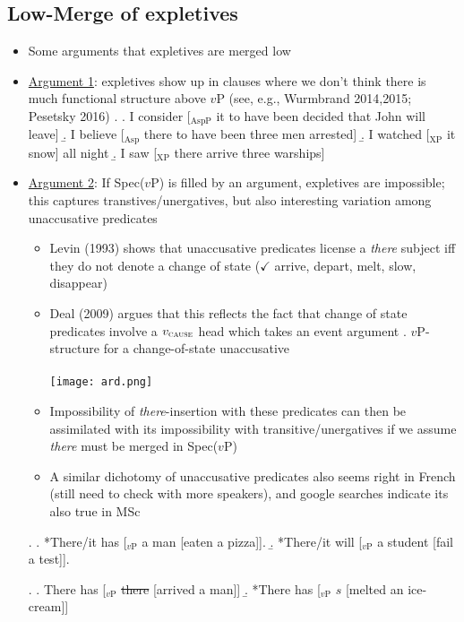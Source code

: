 \documentclass[letterpaper,10pt]{handout_nick}
\begin{document}
\subsection{Low-Merge of expletives}
\begin{itemize}
\item Some arguments that expletives are merged low
\item \underline{Argument 1}: expletives show up in clauses where we don't think there is much functional structure above $v$P (see, e.g., Wurmbrand 2014,2015; Pesetsky 2016)
\ex. \a. I consider [$_\text{AspP}$ it to have been decided that John will leave]
\b. I believe [$_\text{Asp}$ there to have been three men arrested]
\b. I watched [$_\text{XP}$ it snow] all night
\b. I saw [$_\text{XP}$ there arrive three warships]

\item \underline{Argument 2}: If Spec($v$P) is filled by an argument, expletives are impossible; this captures transtives/unergatives, but also interesting variation among unaccusative predicates
\begin{itemize}
\item Levin (1993) shows that unaccusative predicates license a \emph{there} subject iff they do not denote a change of state ($\checkmark$ arrive, depart, \xmark melt, slow, disappear)
\item Deal (2009) argues that this reflects the fact that change of state predicates involve a $v_{\textsc{cause}}$ head which takes an event argument
\ex. $v$P-structure for a change-of-state unaccusative\\\\
\texttt{[image: ard.png]}
 
\item Impossibility of \emph{there}-insertion with these predicates can then be assimilated with its impossibility with transitive/unergatives if we assume \emph{there} must be merged in Spec($v$P)
\item A similar dichotomy of unaccusative predicates also seems right in French (still need to check with more speakers), and google searches indicate its also true in MSc
\end{itemize}
\ex. \a. *There/it has [$_\text{$v$P}$ a man [eaten a pizza]].
\b. *There/it will [$_\text{$v$P}$ a student [fail a test]].

\ex. \a. There has [$_\text{$v$P}$ \st{there} [arrived a man]] 
\b. *There has [$_\text{$v$P}$ $s$ [melted an ice-cream]]


\end{itemize}
\end{document}
